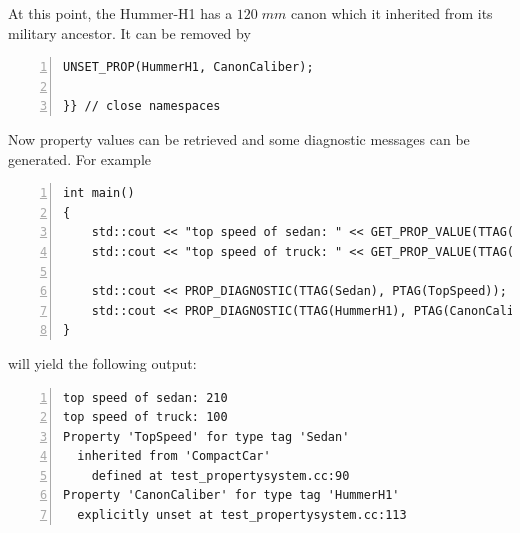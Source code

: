 \noindent
At this point, the Hummer-H1 has a $120\;mm$ canon which it inherited
from its military ancestor. It can be removed by
\begin{lstlisting}[name=propsyscars,basicstyle=\ttfamily\scriptsize,numbers=left,numberstyle=\tiny, numbersep=5pt]
UNSET_PROP(HummerH1, CanonCaliber);

}} // close namespaces
\end{lstlisting}

\noindent
Now property values can be retrieved and some diagnostic messages can
be generated. For example
\begin{lstlisting}[name=propsyscars,basicstyle=\ttfamily\scriptsize,numbers=left,numberstyle=\tiny, numbersep=5pt]
int main()
{
    std::cout << "top speed of sedan: " << GET_PROP_VALUE(TTAG(Sedan), PTAG(TopSpeed)) << "\n";
    std::cout << "top speed of truck: " << GET_PROP_VALUE(TTAG(Truck), PTAG(TopSpeed)) << "\n";

    std::cout << PROP_DIAGNOSTIC(TTAG(Sedan), PTAG(TopSpeed));
    std::cout << PROP_DIAGNOSTIC(TTAG(HummerH1), PTAG(CanonCaliber));
}
\end{lstlisting}
will yield the following output:
\begin{lstlisting}[basicstyle=\ttfamily\scriptsize,numbers=left,numberstyle=\tiny, numbersep=5pt]
top speed of sedan: 210
top speed of truck: 100
Property 'TopSpeed' for type tag 'Sedan'
  inherited from 'CompactCar'
    defined at test_propertysystem.cc:90
Property 'CanonCaliber' for type tag 'HummerH1'
  explicitly unset at test_propertysystem.cc:113
\end{lstlisting}


